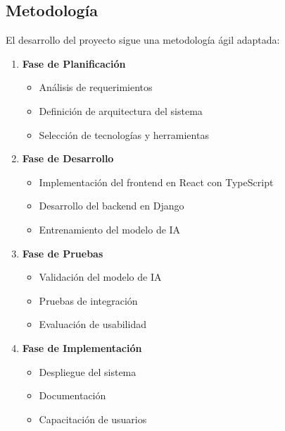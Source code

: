 \documentclass[conference]{IEEEtran}
\begin{document}
\subsection{Metodología}
El desarrollo del proyecto sigue una metodología ágil adaptada:

\begin{enumerate}
    \item \textbf{Fase de Planificación}
    \begin{itemize}
        \item Análisis de requerimientos
        \item Definición de arquitectura del sistema
        \item Selección de tecnologías y herramientas
    \end{itemize}
    
    \item \textbf{Fase de Desarrollo}
    \begin{itemize}
        \item Implementación del frontend en React con TypeScript
        \item Desarrollo del backend en Django
        \item Entrenamiento del modelo de IA
    \end{itemize}
    
    \item \textbf{Fase de Pruebas}
    \begin{itemize}
        \item Validación del modelo de IA
        \item Pruebas de integración
        \item Evaluación de usabilidad
    \end{itemize}
    
    \item \textbf{Fase de Implementación}
    \begin{itemize}
        \item Despliegue del sistema
        \item Documentación
        \item Capacitación de usuarios
    \end{itemize}
\end{enumerate}
\end{document}

